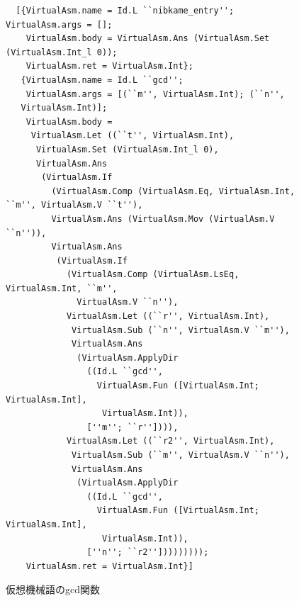 \documentclass[a4paper,titlepage,disablejfam]{jsbook}
\begin{document}
\begin{figure}[htb]
\begin{center}
\begin{lstlisting}
  [{VirtualAsm.name = Id.L ``nibkame_entry''; VirtualAsm.args = [];
    VirtualAsm.body = VirtualAsm.Ans (VirtualAsm.Set (VirtualAsm.Int_l 0));
    VirtualAsm.ret = VirtualAsm.Int};
   {VirtualAsm.name = Id.L ``gcd'';
    VirtualAsm.args = [(``m'', VirtualAsm.Int); (``n'',
   VirtualAsm.Int)];
    VirtualAsm.body =
     VirtualAsm.Let ((``t'', VirtualAsm.Int),
      VirtualAsm.Set (VirtualAsm.Int_l 0),
      VirtualAsm.Ans
       (VirtualAsm.If
         (VirtualAsm.Comp (VirtualAsm.Eq, VirtualAsm.Int, ``m'', VirtualAsm.V ``t''),
         VirtualAsm.Ans (VirtualAsm.Mov (VirtualAsm.V ``n'')),
         VirtualAsm.Ans
          (VirtualAsm.If
            (VirtualAsm.Comp (VirtualAsm.LsEq, VirtualAsm.Int, ``m'',
              VirtualAsm.V ``n''),
            VirtualAsm.Let ((``r'', VirtualAsm.Int),
             VirtualAsm.Sub (``n'', VirtualAsm.V ``m''),
             VirtualAsm.Ans
              (VirtualAsm.ApplyDir
                ((Id.L ``gcd'',
                  VirtualAsm.Fun ([VirtualAsm.Int; VirtualAsm.Int],
                   VirtualAsm.Int)),
                [''m''; ``r'']))),
            VirtualAsm.Let ((``r2'', VirtualAsm.Int),
             VirtualAsm.Sub (``m'', VirtualAsm.V ``n''),
             VirtualAsm.Ans
              (VirtualAsm.ApplyDir
                ((Id.L ``gcd'',
                  VirtualAsm.Fun ([VirtualAsm.Int; VirtualAsm.Int],
                   VirtualAsm.Int)),
                [''n''; ``r2'']))))))));
    VirtualAsm.ret = VirtualAsm.Int}]
  \end{lstlisting}
\caption{仮想機械語のgcd関数}\label{fig:impl-va-sample}
 \end{center}
\end{figure}
\end{document}
